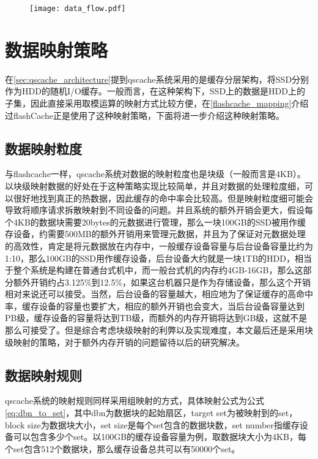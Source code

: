 \begin{figure}[H]
    \centering
    \texttt{[image: data\_flow.pdf]}
\end{figure}

\section{数据映射策略}
在\ref{sec:qscache_architecture}提到qscache系统采用的是缓存分层架构，将SSD分别作为HDD的随机I/O缓存。一般而言，在这种架构下，SSD上的数据是HDD上的子集，因此直接采用取模运算的映射方式比较方便，在\ref{flashcache_mapping}介绍过flashCache正是使用了这种映射策略，下面将进一步介绍这种映射策略。 

\subsection{数据映射粒度}

与flashcache一样，qscache系统对数据的映射粒度也是块级（一般而言是4KB）。以块级映射数据的好处在于这种策略实现比较简单，并且对数据的处理粒度细，可以很好地找到真正的热数据，因此缓存的命中率会比较高。但是映射粒度细可能会导致将顺序请求拆散映射到不同设备的问题。并且系统的额外开销会更大，假设每个4KB的数据块需要20bytes的元数据进行管理，那么一块100GB的SSD被用作缓存设备，约需要500MB的额外开销用来管理元数据，并且为了保证对元数据处理的高效性，肯定是将元数据放在内存中，一般缓存设备容量与后台设备容量比约为1:10，那么100GB的SSD用作缓存设备，后台设备大约就是一块1TB的HDD，相当于整个系统是构建在普通台式机中，而一般台式机的内存约4GB-16GB，那么这部分额外开销约占3.125\%到12.5\%，如果这台机器只是作为存储设备，那么这个开销相对来说还可以接受。当然，后台设备的容量越大，相应地为了保证缓存的高命中率，缓存设备的容量也要扩大，相应的额外开销也会变大，当后台设备容量达到PB级，缓存设备的容量将达到TB级，而额外的内存开销将达到GB级，这就不是那么可接受了。但是综合考虑块级映射的利弊以及实现难度，本文最后还是采用块级映射的策略，对于额外内存开销的问题留待以后的研究解决。

\subsection{数据映射规则}

qscache系统的映射规则同样采用组映射的方式，具体映射公式为公式\ref{eq:dbn_to_set}，其中dbn为数据块的起始扇区，target set为被映射到的set，block size为数据块大小，set size是每个set包含的数据块数，set number指缓存设备可以包含多少个set。以100GB的缓存设备容量为例，取数据块大小为4KB，每个set包含512个数据块，那么缓存设备总共可以有50000个set。


